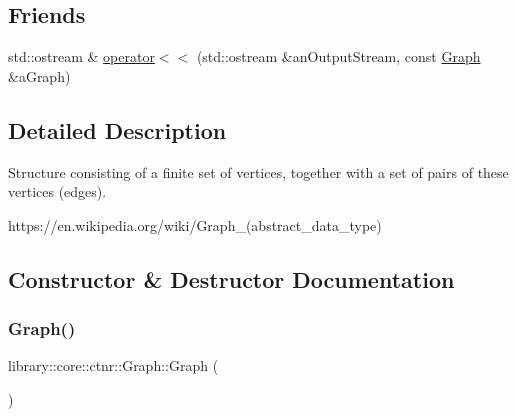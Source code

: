 \subsection*{Friends}
\begin{DoxyCompactItemize}
\item 
std\+::ostream \& \hyperlink{classlibrary_1_1core_1_1ctnr_1_1Graph_a225f9b61ac2385ccf05891298c7ab6b1}{operator$<$$<$} (std\+::ostream \&an\+Output\+Stream, const \hyperlink{classlibrary_1_1core_1_1ctnr_1_1Graph}{Graph} \&a\+Graph)
\end{DoxyCompactItemize}


\subsection{Detailed Description}
Structure consisting of a finite set of vertices, together with a set of pairs of these vertices (edges). 

https\+://en.wikipedia.\+org/wiki/\+Graph\+\_\+(abstract\+\_\+data\+\_\+type) 

\subsection{Constructor \& Destructor Documentation}
\mbox{\label{classlibrary_1_1core_1_1ctnr_1_1Graph_accc4cdce1c3ac23e00d70522857f051d}} 
\subsubsection{\texorpdfstring{Graph()}{Graph()}\hspace{0.1cm}{\footnotesize\ttfamily [1/2]}}
{\footnotesize\ttfamily library\+::core\+::ctnr\+::\+Graph\+::\+Graph (\begin{DoxyParamCaption}{ }\end{DoxyParamCaption})\hspace{0.3cm}{\ttfamily [delete]}}

\mbox{\label{classlibrary_1_1core_1_1ctnr_1_1Graph_aed97aab348693c80c4cd7b4a3cf3c1ba}} 

